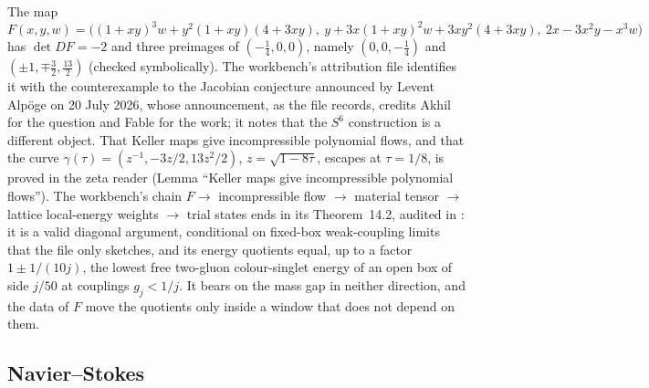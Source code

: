 The map
\[
F(x,y,w)=\bigl((1+xy)^3w+y^2(1+xy)(4+3xy),\ y+3x(1+xy)^2w+3xy^2(4+3xy),\ 2x-3x^2y-x^3w\bigr)
\]
has $\det DF=-2$ and three preimages of $(-\frac14,0,0)$, namely $(0,0,-\frac14)$ and $(\pm1,\mp\frac32,\frac{13}2)$ (checked symbolically). The workbench's attribution file identifies it with the counterexample to the Jacobian conjecture announced by Levent Alpöge on 20 July 2026, whose announcement, as the file records, credits Akhil for the question and Fable for the work; it notes that the $S^6$ construction is a different object. That Keller maps give incompressible polynomial flows, and that the curve $\gamma(\tau)=(z^{-1},-3z/2,13z^2/2)$, $z=\sqrt{1-8\tau}$, escapes at $\tau=1/8$, is proved in the zeta reader (Lemma ``Keller maps give incompressible polynomial flows'').
The workbench's chain $F\to$ incompressible flow $\to$ material tensor $\to$ lattice local-energy weights $\to$ trial states ends in its Theorem~14.2, audited in : it is a valid diagonal argument, conditional on fixed-box weak-coupling limits that the file only sketches, and its energy quotients equal, up to a factor $1\pm1/(10j)$, the lowest free two-gluon colour-singlet energy of an open box of side $j/50$ at couplings $g_j<1/j$. It bears on the mass gap in neither direction, and the data of $F$ move the quotients only inside a window that does not depend on them.

\subsection{Navier--Stokes}

